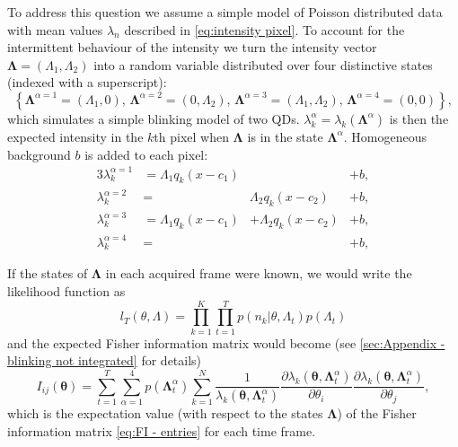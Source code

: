 To address this question we assume a simple model of Poisson distributed data with mean values $\lambda_n$ described in \autoref{eq:intensity pixel}. To account for the intermittent behaviour of the intensity we turn the intensity vector $\bm{\Lambda}=(\Lambda_1,\Lambda_2)$ into a random variable distributed over four distinctive states (indexed with a superscript):
%
\begin{equation*}
	\left\{ \bm{\Lambda}^{\alpha=1}=(\Lambda_1,0),\,\bm{\Lambda}^{\alpha=2}=(0,\Lambda_2),\,\bm{\Lambda}^{\alpha=3}=(\Lambda_1,\Lambda_2),\,\bm{\Lambda}^{\alpha=4}=(0,0)\right\},
\end{equation*}
%
which simulates a simple blinking model of two QDs. $\lambda_k^\alpha=\lambda_k(\bm{\Lambda}^\alpha)$ is then the expected intensity in the $k$th pixel when $\bm{\Lambda}$ is in the state $\bm{\Lambda}^\alpha$. Homogeneous background $b$ is added to each pixel:
%
\begin{alignat}{3}
	\lambda_k^{\alpha=1}&=\Lambda_1q_k(x-c_1) & &+b,\nonumber\\ 
	\lambda_k^{\alpha=2}&=&\Lambda_2q_k(x-c_2) &+b,\nonumber\\ 
	\lambda_k^{\alpha=3}&=\Lambda_1q_k(x-c_1)&+\Lambda_2q_k(x-c_2)&+b,\nonumber\\ 
	\lambda_k^{\alpha=4}&=& &+b,
	\label{eq:lambda states}
\end{alignat}

If the states of $\bm{\Lambda}$ in each acquired frame were known, we would write the likelihood function as 
%
\begin{equation}
	l_T(\theta,\Lambda)=\prod_{k=1}^K\prod_{t=1}^Tp(n_k|\theta,\Lambda_t)p(\Lambda_t)
\end{equation}
%
and the expected Fisher information matrix would become (see \autoref{sec:Appendix - blinking not integrated} for details)
%
\begin{equation}
	I_{ij}(\bm{\theta})=\sum_{t=1}^T\sum_{\alpha=1}^4p(\bm{\Lambda}^\alpha_t)\sum_{k=1}^N\frac{1}{\lambda_k(\bm{\theta},\bm{\Lambda}^\alpha_t)}\frac{\partial\lambda_k(\bm{\theta},\bm{\Lambda}^\alpha_t)}{\partial\theta_i}\frac{\partial\lambda_k(\bm{\theta},\bm{\Lambda}^\alpha_t)}{\partial\theta_j},
	\label{eq:Fisher Information Blinking Cheating}
\end{equation}
%
which is the expectation value (with respect to the states $\bm{\Lambda}$) of the Fisher information matrix \autoref{eq:FI - entries} for each time frame. 

